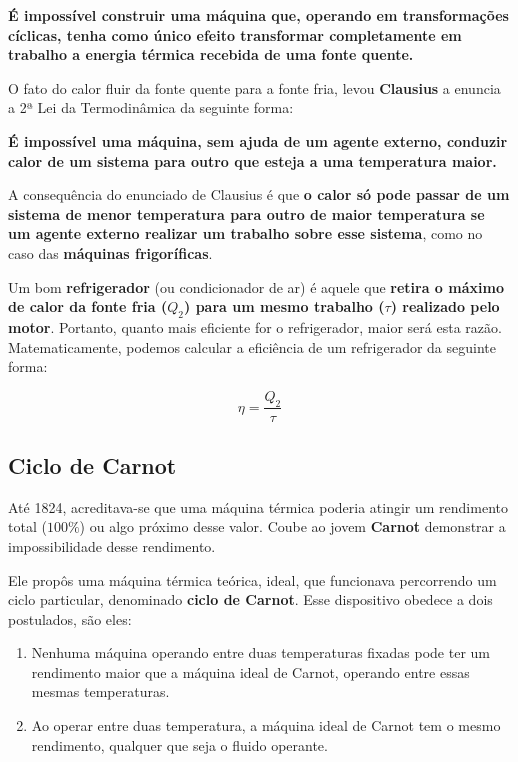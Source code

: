 \documentclass[12pt]{article}
\begin{document}
\textbf{É impossível construir uma máquina que, operando em transformações cíclicas, tenha como único efeito transformar completamente em trabalho a energia térmica recebida de uma fonte quente.}


O fato do calor fluir da fonte quente para a fonte fria, levou \textbf{Clausius} a enuncia a 2ª Lei da Termodinâmica da seguinte forma:


\textbf{É impossível uma máquina, sem ajuda de um agente externo, conduzir calor de um sistema para outro que esteja a uma temperatura maior.}


A consequência do enunciado de Clausius é que \textbf{o calor só pode passar de um sistema de menor temperatura para outro de maior temperatura se um agente externo realizar um trabalho sobre esse sistema}, como no caso das \textbf{máquinas frigoríficas}.


Um bom \textbf{refrigerador} (ou condicionador de ar) é aquele que \textbf{retira o máximo de calor da fonte fria ($Q_{2}$) para um mesmo trabalho ($\tau$) realizado pelo motor}. Portanto, quanto mais eficiente for o refrigerador, maior será esta razão. Matematicamente, podemos calcular a eficiência de um refrigerador da seguinte forma:


\begin{equation}
    \eta = \dfrac{Q_{2}}{\tau}
\end{equation}


\hypertarget{x-ciclo-de-carnot}{\subsection{Ciclo de Carnot}}
Até 1824, acreditava-se que uma máquina térmica poderia atingir um rendimento total ($100\%$) ou algo próximo desse valor. Coube ao jovem \textbf{Carnot} demonstrar a impossibilidade desse rendimento.


Ele propôs uma máquina térmica teórica, ideal, que funcionava percorrendo um ciclo particular, denominado \textbf{ciclo de Carnot}. Esse dispositivo obedece a dois postulados, são eles:


\begin{enumerate}

\item{Nenhuma máquina operando entre duas temperaturas fixadas pode ter um rendimento maior que a máquina ideal de Carnot, operando entre essas mesmas temperaturas.}

\item{Ao operar entre duas temperatura, a máquina ideal de Carnot tem o mesmo rendimento, qualquer que seja o fluido operante.}

\end{enumerate}
\end{document}

